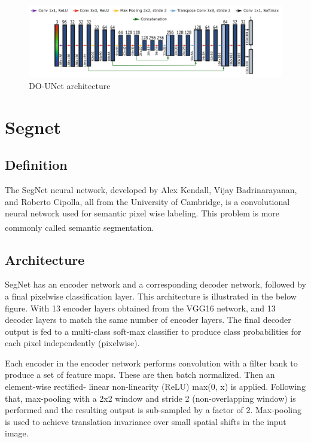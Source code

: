 \begin{figure}[H]
\centering
  \vspace{-0.1in}
    \centerline{\includegraphics[width = \linewidth]{../images/DO-UNET.png}}
    \caption{DO-UNet architecture}
    \label{fig:DO-UNET}
\end{figure}

\section{Segnet}
\subsection{Definition}
\hspace{\parindent}
The SegNet neural network, developed by Alex Kendall, Vijay Badrinarayanan, and Roberto Cipolla, all from the University of Cambridge, is a convolutional neural network used for semantic pixel wise labeling. This problem is more commonly called semantic segmentation. \textsuperscript{\cite{badrinarayanan2017segnet}}

\subsection{Architecture}
\hspace{\parindent}
SegNet has an encoder network and a corresponding decoder network, followed by a final pixelwise classification layer. This architecture is illustrated in the below figure.
With 13 encoder layers obtained from the VGG16 network, and 13 decoder layers to match the same number of encoder layers. The final decoder output is fed to a multi-class soft-max classifier to produce class probabilities for each pixel independently (pixelwise).

Each encoder in the encoder network performs convolution with a filter bank to produce a set of feature maps. These are then batch normalized. Then an element-wise rectified- linear non-linearity (ReLU) max(0, x) is applied. Following that, max-pooling with a 2x2 window and stride 2 (non-overlapping window) is performed and the resulting output is sub-sampled by a factor of 2. Max-pooling is used to achieve translation invariance over small spatial shifts in the input image.

